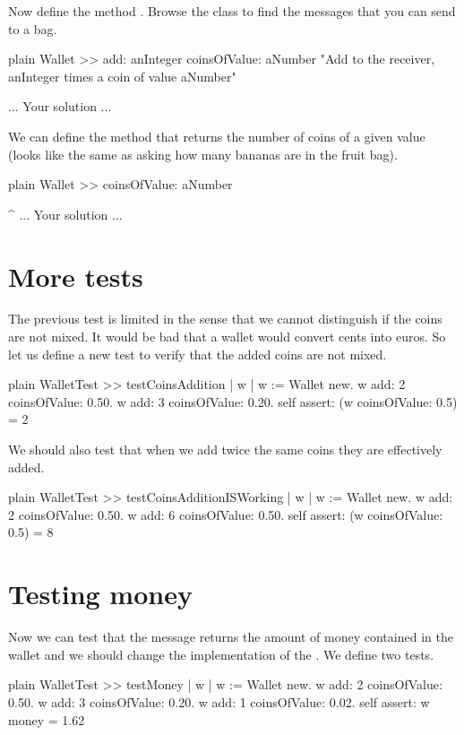 \documentclass[10pt,twoside,english]{_support/latex/sbabook/sbabook}
\begin{document}
Now define the method . Browse the class  to find the messages that you can send to a bag.

\begin{displaycode}{plain}
Wallet >> add: anInteger coinsOfValue: aNumber
	"Add to the receiver, anInteger times a coin of value aNumber"
	
	... Your solution ...
\end{displaycode}

We can define the method  that returns the number of coins of a given value (looks like the same as asking how many bananas are in the fruit bag).

\begin{displaycode}{plain}
Wallet >> coinsOfValue: aNumber

	^ ... Your solution ...
\end{displaycode}
\section{More tests}
The previous test is limited in the sense that we cannot distinguish if the coins are not mixed. 
It would be bad that a wallet would convert cents into euros. So let us define a new test to verify that the added coins are not mixed. 

\begin{displaycode}{plain}
WalletTest >> testCoinsAddition
	| w |
	w := Wallet new.
	w add: 2 coinsOfValue: 0.50.
	w add: 3 coinsOfValue: 0.20.
	self assert: (w coinsOfValue: 0.5) = 2
\end{displaycode}

We should also test that when we add twice the same coins they are effectively added. 

\begin{displaycode}{plain}
WalletTest >> testCoinsAdditionISWorking
	| w |
	w := Wallet new.
	w add: 2 coinsOfValue: 0.50.
	w add: 6 coinsOfValue: 0.50.
	self assert: (w coinsOfValue: 0.5) = 8
\end{displaycode}
\section{Testing money}
Now we can test that the  message returns the amount of money contained in the wallet and we should change
the implementation of the . We define two tests. 

\begin{displaycode}{plain}
WalletTest >> testMoney
	| w |
	w := Wallet new.
	w add: 2 coinsOfValue: 0.50.
	w add: 3 coinsOfValue: 0.20.
	w add: 1 coinsOfValue: 0.02.
	self assert: w money = 1.62
\end{displaycode}
\end{document}
